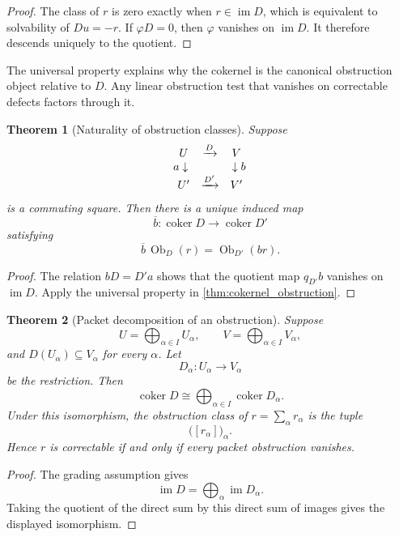 \documentclass{aomart}
\newtheorem{theorem}{Theorem}[section]
\theoremstyle{definition}
\theoremstyle{remark}
\newcommand{\im}{\operatorname{im}}
\newcommand{\coker}{\operatorname{coker}}
\newcommand{\Ob}{\operatorname{Ob}}
\begin{document}
\begin{proof}
The class of $r$ is zero exactly when $r\in\im D$, which is equivalent to solvability of $Du=-r$.  If $\varphi D=0$, then $\varphi$ vanishes on $\im D$.  It therefore descends uniquely to the quotient.
\end{proof}

The universal property explains why the cokernel is the canonical obstruction object relative to $D$.  Any linear obstruction test that vanishes on correctable defects factors through it.

\begin{theorem}[Naturality of obstruction classes]\label{thm:obstruction_naturality}
Suppose
\[
\begin{array}{ccc}
U & \xrightarrow{D} & V\\
\mathllap{a}\downarrow & & \downarrow\mathrlap{b}\\
U' & \xrightarrow{D'} & V'
\end{array}
\]
is a commuting square.  Then there is a unique induced map
\[
\overline b:\coker D\longrightarrow\coker D'
\]
satisfying
\[
\overline b\,\Ob_D(r)=\Ob_{D'}(br).
\]
\end{theorem}

\begin{proof}
The relation $bD=D'a$ shows that the quotient map $q_{D'}b$ vanishes on $\im D$.  Apply the universal property in \cref{thm:cokernel_obstruction}.
\end{proof}

\begin{theorem}[Packet decomposition of an obstruction]\label{thm:packet_obstruction_decomposition}
Suppose
\[
U=\bigoplus_{\alpha\in I}U_\alpha,
\qquad
V=\bigoplus_{\alpha\in I}V_\alpha,
\]
and $D(U_\alpha)\subseteq V_\alpha$ for every $\alpha$.  Let
\[
D_\alpha:U_\alpha\longrightarrow V_\alpha
\]
be the restriction.  Then
\[
\coker D
\cong
\bigoplus_{\alpha\in I}\coker D_\alpha.
\]
Under this isomorphism, the obstruction class of $r=\sum_\alpha r_\alpha$ is the tuple
\[
\big([r_\alpha]\big)_\alpha.
\]
Hence $r$ is correctable if and only if every packet obstruction vanishes.
\end{theorem}

\begin{proof}
The grading assumption gives
\[
\im D=\bigoplus_\alpha\im D_\alpha.
\]
Taking the quotient of the direct sum by this direct sum of images gives the displayed isomorphism.
\end{proof}
\end{document}

